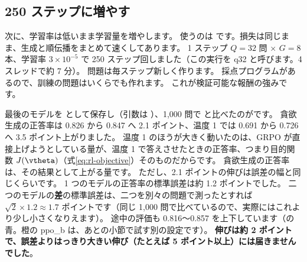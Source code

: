 \subsection{250 ステップに増やす}

次に、学習率は低いまま学習量を増やします。
使うのは  です。損失は同じまま、生成と順伝播をまとめて速くしてあります。
1 ステップ $Q=32$ 問 × $G=8$ 本、学習率 $3\times10^{-5}$ で 250 ステップ回しました（この実行を q32 と呼びます。4 スレッドで約 7 分）。
問題は毎ステップ新しく作ります。
採点プログラムがあるので、訓練の問題はいくらでも作れます。
これが検証可能な報酬の強みです。

最後のモデルを  として保存し（引数は ）、1,000 問で  と比べたのがです。
貪欲生成の正答率は 0.826 から 0.847 へ 2.1 ポイント、温度 1 では 0.691 から 0.726 へ 3.5 ポイント上がりました。
温度 1 のほうが大きく動いたのは、GRPO が直接上げようとしている量が、温度 1 で答えさせたときの正答率、つまり目的関数 $J(\vtheta)$（式\eqref{eq:rl-objective}）そのものだからです。
貪欲生成の正答率は、その結果として上がる量です。
ただし、2.1 ポイントの伸びは誤差の幅と同じくらいです。
1 つのモデルの正答率の標準誤差は約 1.2 ポイントでした。
二つのモデルの\textbf{差}の標準誤差は、二つを別々の問題で測ったとすれば $\sqrt2\times1.2\approx1.7$ ポイントです（同じ 1,000 問で比べているので、実際にはこれより少し小さくなりえます）。
途中の評価も 0.816〜0.857 を上下しています（の青。橙の ppo\_b は、あとの小節で試す別の設定です）。
\textbf{伸びは約 2 ポイントで、誤差よりはっきり大きい伸び（たとえば 5 ポイント以上）には届きませんでした}。


